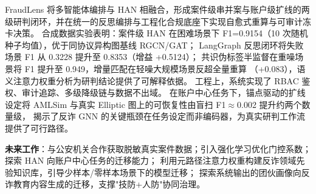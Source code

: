 \documentclass[12pt,a4paper,fontset=windows]{ctexart}
\begin{document}
FraudLens 将多智能体编排与 HAN 相融合，形成案件级串并案与账户级扩线的两级研判闭环，并在统一的反思编排与工程化合规底座下实现自愈式重算与可审计冻卡决策。
合成数据实验表明：案件级 HAN 在困难场景下 F1=0.9154（10 次随机种子均值），优于同协议异构图基线 RGCN/GAT；
LangGraph 反思闭环将失败场景 F1 从 0.3228 提升至 0.8353（增益 +0.5124）；
共识伪标签半监督在重噪场景将 F1 提升至 0.949，增量匹配在轻噪大规模场景反超全量重算
（+0.083），语义注意力权重分析为研判结论提供了可解释依据。
工程上，系统实现了 RBAC 鉴权、审计追踪、多级降级链与数据不出域。
在账户中心任务下，锚点驱动的扩线设定将 AMLSim 与真实 Elliptic 图上的可恢复性由盲扫 F1$\approx$0.002 提升约两个数量级，
揭示了反诈 GNN 的关键瓶颈在任务设定而非编码器，为真实研判工作流提供了可行路径。

\textbf{未来工作}：与公安机关合作获取脱敏真实案件数据；引入强化学习优化门控系数；
探索 HAN 向账户中心任务的迁移能力；
利用元路径注意力权重构建反诈领域先验知识库，引导少样本/零样本场景下的模型迁移；
探索系统输出的团伙画像向反诈教育内容生成的迁移，支撑"技防+人防"协同治理。



\end{document}
